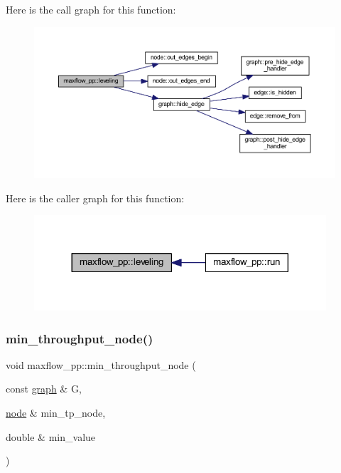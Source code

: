Here is the call graph for this function\+:\nopagebreak
\begin{figure}[H]
\begin{center}
\leavevmode
\includegraphics[width=350pt]{classmaxflow__pp_adefb2cdc0145d57efd2d93c17a180896_cgraph}
\end{center}
\end{figure}
Here is the caller graph for this function\+:\nopagebreak
\begin{figure}[H]
\begin{center}
\leavevmode
\includegraphics[width=308pt]{classmaxflow__pp_adefb2cdc0145d57efd2d93c17a180896_icgraph}
\end{center}
\end{figure}
\mbox{\label{classmaxflow__pp_a9f820f51329f0e0ec4d8123547ae6ebd}} 
\subsubsection{\texorpdfstring{min\+\_\+throughput\+\_\+node()}{min\_throughput\_node()}}
{\footnotesize\ttfamily void maxflow\+\_\+pp\+::min\+\_\+throughput\+\_\+node (\begin{DoxyParamCaption}\item[{const \mbox{\hyperlink{classgraph}{graph}} \&}]{G,  }\item[{\mbox{\hyperlink{classnode}{node}} \&}]{min\+\_\+tp\+\_\+node,  }\item[{double \&}]{min\+\_\+value }\end{DoxyParamCaption})\hspace{0.3cm}{\ttfamily [protected]}}



